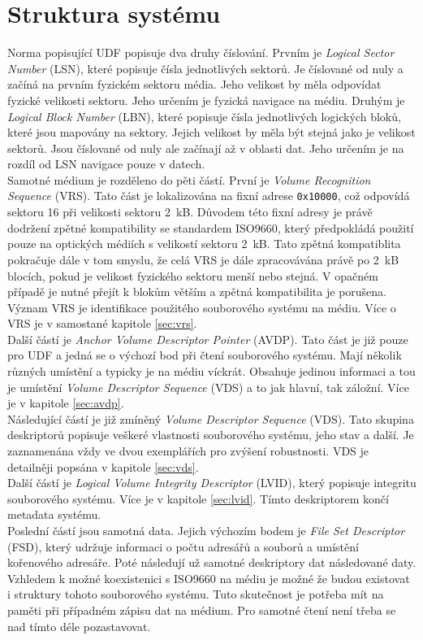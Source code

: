 \section{Struktura systému}
Norma popisující UDF popisuje dva druhy číslování. Prvním je \textit{Logical Sector Number} (LSN), které popisuje čísla jednotlivých sektorů. Je číslované od nuly a začíná na prvním fyzickém sektoru média. Jeho velikost by měla odpovídat fyzické velikosti sektoru. Jeho určením je fyzická navigace na médiu. Druhým je \textit{Logical Block Number} (LBN), které popisuje čísla jednotlivých logických bloků, které jsou mapovány na sektory. Jejich velikost by měla být stejná jako je velikost sektorů. Jsou číslované od nuly ale začínají až v oblasti dat. Jeho určením je na rozdíl od LSN navigace pouze v datech.\\
Samotné médium je rozděleno do pěti částí. První je \textit{Volume Recognition Sequence} (VRS). Tato část je lokalizována na fixní adrese \texttt{0x10000}, což odpovídá sektoru 16 při velikosti sektoru 2~kB. Důvodem této fixní adresy je právě dodržení zpětné kompatibility se standardem ISO9660, který předpokládá použití pouze na optických médiích s velikostí sektoru 2~kB. Tato zpětná kompatiblita pokračuje dále v tom smyslu, že celá VRS je dále zpracovávána právě po 2~kB blocích, pokud je velikost fyzického sektoru menší nebo stejná. V opačném případě je nutné přejít k blokům větším a zpětná kompatibilita je porušena. Význam VRS je identifikace použitého souborového systému na médiu. Více o VRS je v samostané kapitole \ref{sec:vrs}.\\
Další částí je \textit{Anchor Volume Descriptor Pointer} (AVDP). Tato část je již pouze pro UDF a jedná se o výchozí bod při čtení souborového systému. Mají několik různých umístění a typicky je na médiu víckrát. Obsahuje jedinou informaci a tou je umístění \textit{Volume Descriptor Sequence} (VDS) a to jak hlavní, tak záložní. Více je v kapitole \ref{sec:avdp}.\\
Následující částí je již zmíněný \textit{Volume Descriptor Sequence} (VDS). Tato skupina deskriptorů popisuje veškeré vlastnosti souborového systému, jeho stav a další. Je zaznamenána vždy ve dvou exemplářích pro zvýšení robustnosti. VDS je detailněji popsána v kapitole \ref{sec:vds}.\\
Další částí je \textit{Logical Volume Integrity Descriptor} (LVID), který popisuje integritu souborového systému. Více je v kapitole \ref{sec:lvid}. Tímto deskriptorem končí metadata systému.\\
Poslední částí jsou samotná data. Jejich výchozím bodem je \textit{File Set Descriptor} (FSD), který udržuje informaci o počtu adresářů a souborů a umístění kořenového adresáře. Poté následují už samotné deskriptory dat následované daty.\\
Vzhledem k možné koexistenici s ISO9660 na médiu je možné že budou existovat i struktury tohoto souborového systému. Tuto skutečnost je potřeba mít na paměti při případném zápisu dat na médium. Pro samotné čtení není třeba se nad tímto déle pozastavovat.

